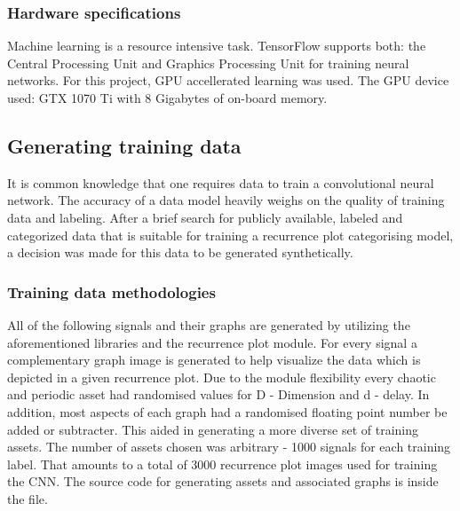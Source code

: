 \documentclass[a4paper,12pt,fleqn]{article}
\begin{document}
\subsubsection{Hardware specifications}
\label{sec:hardware}
Machine learning is a resource intensive task.
TensorFlow supports both: the Central Processing Unit and Graphics Processing Unit for training neural networks.
For this project, GPU accellerated learning was used.
The GPU device used: GTX 1070 Ti with 8 Gigabytes of on-board memory.


\subsection{Generating training data}
It is common knowledge that one requires data to train a convolutional neural network.
The accuracy of a data model heavily weighs on the quality of training data and labeling.
After a brief search for publicly available, labeled and categorized data that is suitable for training a recurrence plot categorising model, a decision was made for this data to be generated synthetically.


\subsubsection{Training data methodologies}
All of the following signals and their graphs are generated by utilizing
the aforementioned libraries and the recurrence plot module.
For every signal a complementary graph image is generated to help visualize the data which is depicted in a given recurrence plot.
Due to the module flexibility every chaotic and periodic asset had randomised values for D - Dimension and d - delay.
In addition, most aspects of each graph had a randomised floating point number be added or subtracter.
This aided in generating a more diverse set of training assets.
The number of assets chosen was arbitrary - 1000 signals for each training label.
That amounts to a total of 3000 recurrence plot images used for training the CNN.
The source code for generating assets and associated graphs is inside the  file.


\end{document}

